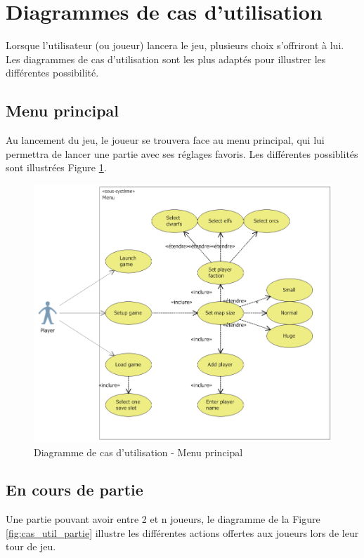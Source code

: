 \section{Diagrammes de cas d'utilisation}
	\label{sec:cas_utilisation}

	Lorsque l'utilisateur (ou joueur) lancera le jeu, plusieurs choix s'offriront à lui. Les diagrammes de cas d'utilisation sont les plus adaptés pour illustrer les différentes possibilité.

	\subsection{Menu principal}
		Au lancement du jeu, le joueur se trouvera face au menu principal, qui lui permettra de lancer une partie avec ses réglages favoris.
		Les différentes possiblités sont illustrées Figure \ref{fig:cas_util_menu}.

		\begin{figure}[h!]
			\centering
			\includegraphics[width=1\textwidth]{figure/cas_util_menu.png}
			\caption{Diagramme de cas d'utilisation - Menu principal}
			\label{fig:cas_util_menu}
		\end{figure}

	\subsection{En cours de partie}
		Une partie pouvant avoir entre 2 et n joueurs, le diagramme de la Figure \ref{fig:cas_util_partie} illustre les différentes actions offertes aux joueurs lors de leur tour de jeu.

